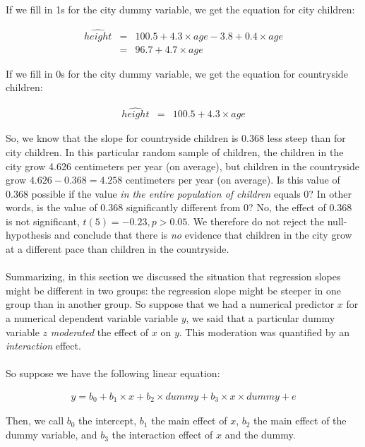 \documentclass[]{report}\usepackage[]{graphicx}\usepackage[]{color}
\begin{document}
If we fill in 1s for the city dummy variable, we get the equation for city children:

\begin{eqnarray} 
\widehat{height} &=& 100.5 + 4.3  \times age  -3.8  + 0.4 \times age    \nonumber \\
   &=&      96.7 + 4.7 \times age
 \end{eqnarray}


If we fill in 0s for the city dummy variable, we get the equation for countryside children:

\begin{eqnarray} 
\widehat{height} &=& 100.5 + 4.3  \times age   \nonumber
 \end{eqnarray}

So, we know that the slope for countryside children is 0.368 less steep than for city children. In this particular random sample of children, the children in the city grow 4.626 centimeters per year (on average), but children in the countryside grow $4.626-0.368= 4.258$ centimeters per year (on average). Is this value of 0.368 possible if the value \textit{in the entire population of children} equals 0? In other words, is the value of 0.368 significantly different from 0? No, the effect of 0.368 is not significant, $t(5)=-0.23, p>0.05$. We therefore do not reject the null-hypothesis and conclude that there is \textit{no} evidence that children in the city grow at a different pace than children in the countryside.\\
\\
Summarizing, in this section we discussed the situation that regression slopes might be different in two groups: the regression slope might be steeper in one group than in another group. So suppose that we had a numerical predictor $x$ for a numerical dependent variable variable $y$, we said that a particular dummy variable $z$ \textit{moderated} the effect of $x$ on $y$. This moderation was quantified by an \textit{interaction} effect.
\\
\\
So suppose we have the following linear equation:


\begin{eqnarray} 
y =  b_0 + b_1  \times x + b_2  \times dummy +b_3 \times x \times dummy + e \nonumber
\end{eqnarray}

Then, we call $b_0$ the intercept, $b_1$ the main effect of $x$, $b_2$ the main effect of the dummy variable, and $b_3$ the interaction effect of $x$ and the dummy. 
\end{document}
